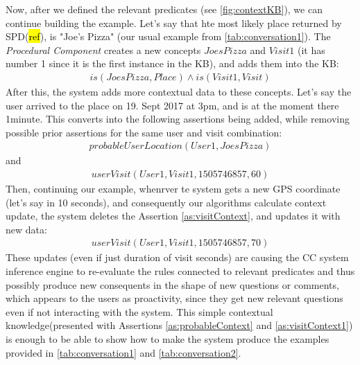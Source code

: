 Now, after we defined the relevant predicates (see \autoref{fig:contextKB}), we 
can continue building the example.
Let's say that hte most likely place returned by SPD(\hl{ref}), is "Joe's Pizza"
(our usual example from \autoref{tab:conversation1}). The 
\emph{Procedural Component} creates a new concepts  $JoesPizza$ and 
$Visit1$ (it has number 1 since it is the first instance in the KB), and adds 
them into the KB:
\begin{equation}\label{as:joesPizzaVisit}
\begin{gathered}
	is(JoesPizza,Place) \land is(Visit1,Visit)
\end{gathered}
\end{equation}
After this, the system adds more contextual data to these concepts. Let's say
the user arrived to the place on 19. Sept 2017 at 3pm, and is at the moment
there 1minute. This converts into the following assertions being added, while
removing possible prior assertions for the same user and visit combination:
\begin{equation}\label{as:probableContext}
\begin{gathered}
	probableUserLocation(User1,JoesPizza)
\end{gathered}
\end{equation}
and
\begin{equation}\label{as:visitContext}
\begin{gathered}
	userVisit(User1,Visit1,1505746857,60)
\end{gathered}
\end{equation}
Then, continuing our example, whenrver te system gets a new GPS coordinate
(let's say in 10 seconds), and consequently our algorithms calculate context 
update, the system deletes the Assertion \ref{as:visitContext}, and updates it
with new data:
\begin{equation}\label{as:visitContext1}
\begin{gathered}
	userVisit(User1,Visit1,1505746857,70)
\end{gathered}
\end{equation}
These updates (even if just duration of visit seconds) are causing the CC 
system inference engine to re-evaluate the rules connected to relevant 
predicates and thus possibly produce new consequents in the shape of new 
questions or comments, which appears to the users as proactivity, since they 
get new relevant questions even if not interacting with the system.
This simple contextual knowledge(presented with Assertions 
\ref{as:probableContext} and \ref{as:visitContext1}) is enough to be able to 
show how to make the system produce the examples provided in 
\autoref{tab:conversation1} and \autoref{tab:conversation2}.


